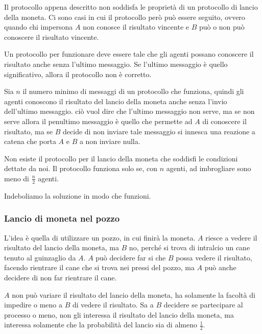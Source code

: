 Il protocollo appena descritto non soddisfa le proprietà di un protocollo di lancio della 
moneta. Ci sono casi in cui il protocollo però può essere seguito, ovvero quando chi 
impersona $A$ non conosce il risultato vincente e $B$ può o non può conoscere il risultato 
vincente.
\begin{tcolorbox}
  Un protocollo per funzionare deve essere tale che gli agenti possano conoscere il 
  risultato anche senza l'ultimo messaggio. Se l'ultimo messaggio è quello significativo,
  allora il protocollo non è corretto.
\end{tcolorbox}
Sia $n$ il numero minimo di messaggi di un protocollo che funziona, quindi gli agenti conoscono 
il risultato del lancio della moneta anche senza l'invio dell'ultimo messaggio.
ciò vuol dire che l'ultimo messaggio non serve, ma se non serve allora il penultimo 
messaggio è quello che permette ad $A$ di conoscere il risultato, ma se $B$ decide di non 
inviare tale messaggio si innesca una reazione a catena che porta $A$ e $B$ a non inviare nulla.
\begin{tcolorbox}
Non esiste il protocollo per il lancio della moneta che soddisfi le condizioni dettate da noi.
Il protocollo funziona solo se, con $n$ agenti, ad imbrogliare sono meno di $\frac{n}{2}$ agenti.
\end{tcolorbox}
Indeboliamo la soluzione in modo che funzioni.
\subsubsection{Lancio di moneta nel pozzo}
L'idea è quella di utilizzare un pozzo, in cui finirà la moneta. $A$ riesce a vedere il risultato
del lancio della moneta, ma $B$ no, perché si trova di intralcio un cane tenuto 
al guinzaglio da $A$. $A$ può decidere far si che $B$ possa vedere il risultato, facendo rientrare 
il cane che si trova nei pressi del pozzo, ma $A$ può anche decidere di non far rientrare il cane.

$A$ non può variare il risultato del lancio della moneta, ha solamente la facoltà di impedire o meno 
a $B$ di vedere il risultato. Sa a $B$ decidere se partecipare al processo o meno, non gli interessa
il risultato del lancio della moneta, ma interessa solamente che la probabilità del lancio sia di 
almeno $\frac{1}{2}$.
